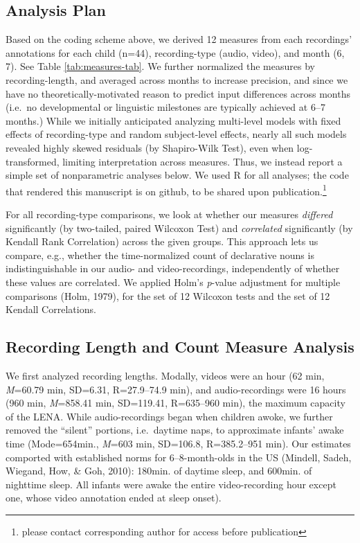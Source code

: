 \documentclass[man]{apa6}
\theoremstyle{definition}
\theoremstyle{definition}
\theoremstyle{definition}
\theoremstyle{remark}
\begin{document}
\subsection{Analysis Plan}\label{analysis-plan}

Based on the coding scheme above, we derived 12 measures from each
recordings' annotations for each child (n=44), recording-type (audio,
video), and month (6, 7). See Table \ref{tab:measures-tab}. We further
normalized the measures by recording-length, and averaged across months
to increase precision, and since we have no theoretically-motivated
reason to predict input differences across months (i.e.~no developmental
or linguistic milestones are typically achieved at 6--7 months.) While
we initially anticipated analyzing multi-level models with fixed effects
of recording-type and random subject-level effects, nearly all such
models revealed highly skewed residuals (by Shapiro-Wilk Test), even
when log-transformed, limiting interpretation across measures. Thus, we
instead report a simple set of nonparametric analyses below. We used R
for all analyses; the code that rendered this manuscript is on github,
to be shared upon
publication.\footnote{please contact corresponding author for access before publication}

For all recording-type comparisons, we look at whether our measures
\emph{differed} significantly (by two-tailed, paired Wilcoxon Test) and
\emph{correlated} significantly (by Kendall Rank Correlation) across the
given groups. This approach lets us compare, e.g., whether the
time-normalized count of declarative nouns is indistinguishable in our
audio- and video-recordings, independently of whether these values are
correlated. We applied Holm's \emph{p}-value adjustment for multiple
comparisons (Holm, 1979), for the set of 12 Wilcoxon tests and the set
of 12 Kendall Correlations.

\subsection{Recording Length and Count Measure
Analysis}\label{recording-length-and-count-measure-analysis}

We first analyzed recording lengths. Modally, videos were an hour (62
min, \emph{M}=60.79 min, SD=6.31, R=27.9--74.9 min), and
audio-recordings were 16 hours (960 min, \emph{M}=858.41 min, SD=119.41,
R=635--960 min), the maximum capacity of the LENA. While
audio-recordings began when children awoke, we further removed the
\enquote{silent} portions, i.e.~daytime naps, to approximate infants'
awake time (Mode=654min., \emph{M}=603 min, SD=106.8, R=385.2--951 min).
Our estimates comported with established norms for 6--8-month-olds in
the US (Mindell, Sadeh, Wiegand, How, \& Goh, 2010): 180min. of daytime
sleep, and 600min. of nighttime sleep. All infants were awake the entire
video-recording hour except one, whose video annotation ended at sleep
onset).
\end{document}
